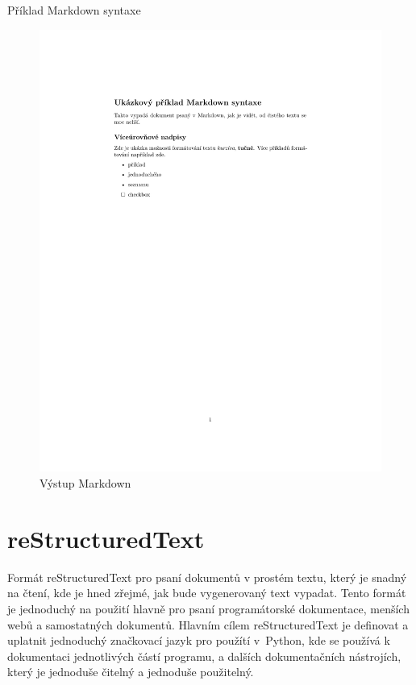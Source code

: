 \begin{listing}[ht]
    \inputminted[linenos,breaklines]{md}{example.md}
    \caption{Příklad Markdown syntaxe}
    \label{lst:markdown}
\end{listing}

\begin{figure}[h]
    \centering
    \includegraphics[width=\textwidth]{example.pdf}
    \caption{Výstup Markdown}
    \label{fig:markdown}
\end{figure}

\clearpage

\section{reStructuredText}

Formát reStructuredText pro psaní dokumentů v prostém textu, který je snadný na čtení, kde je hned zřejmé, jak bude vygenerovaný text vypadat.
Tento formát je jednoduchý na použití hlavně pro psaní programátorské dokumentace, menších webů a samostatných dokumentů.
Hlavním cílem reStructuredText je definovat a uplatnit jednoduchý značkovací jazyk pro použítí v~Python, kde se používá k dokumentaci jednotlivých částí programu,
a dalších dokumentačních nástrojích, který je jednoduše čitelný a jednoduše použitelný. \cite{reStruDoc}


